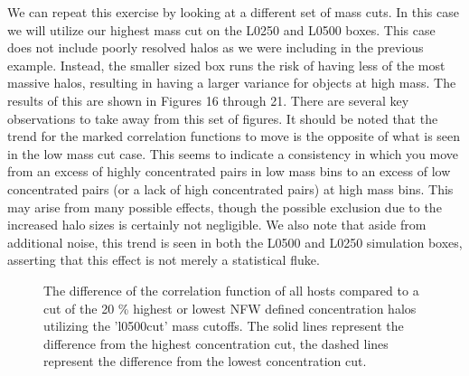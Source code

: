\documentclass[usenatbib,usegraphicx,letterpaper]{mn2e}
\begin{document}

We can repeat this exercise by looking at a different set of mass cuts. In this case we will utilize our highest mass cut on the L0250 and L0500 boxes. This case does not include poorly resolved halos as we were including in the previous example. Instead, the smaller sized box runs the risk of having less of the most massive halos, resulting in having a larger variance for objects at high mass. The results of this are shown in Figures 16 through 21. There are several key observations to take away from this set of figures. It should be noted that the trend for the marked correlation functions to move is the opposite of what is seen in the low mass cut case. This seems to indicate a consistency in which you move from an excess of highly concentrated pairs in low mass bins to an excess of low concentrated pairs (or a lack of high concentrated pairs) at high mass bins. This may arise from many possible effects, though the possible exclusion due to the increased halo sizes is certainly not negligible. We also note that aside from additional noise, this trend is seen in both the L0500 and L0250 simulation boxes, asserting that this effect is not merely a statistical fluke.

\begin{figure}
	\centering
	\caption{The difference of the correlation function of all hosts compared to a cut of the 20 \% highest or lowest NFW defined concentration halos utilizing the 'l0500cut' mass cutoffs. The solid lines represent the difference from the highest concentration cut, the dashed lines represent the difference from the lowest concentration cut.}
\end{figure}
\end{document}
